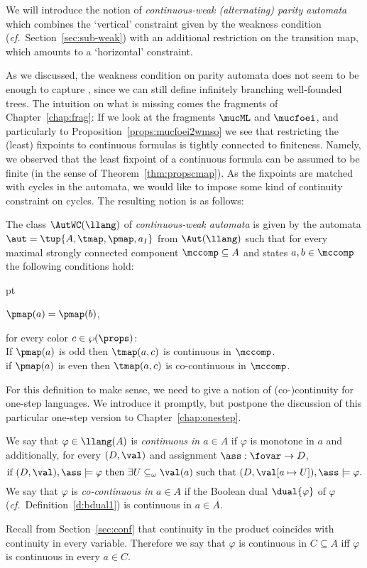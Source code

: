 
We will introduce the notion of \emph{continuous-weak (alternating) parity automata} which combines the `vertical' constraint given by the weakness condition (\emph{cf.}~Section~\ref{sec:sub-weak}) with an additional restriction on the transition map, which amounts to a `horizontal' constraint.

As we discussed, the weakness condition on parity automata does not seem to be enough to capture \wmso, since we can still define infinitely branching well-founded trees. The intuition on what is missing comes the fragments of Chapter~\ref{chap:frag}:
%
If we look at the fragments $\mucML$ and $\mucfoei$, and particularly to Proposition~\ref{props:mucfoei2wmso} we see that restricting the (least) fixpoints to continuous formulas is tightly connected to finiteness. Namely, we observed that the least fixpoint of a continuous formula can be assumed to be finite (in the sense of Theorem~\ref{thm:propscmap}).
%
As the fixpoints are matched with cycles in the automata, we would like to impose some kind of continuity constraint on cycles. The resulting notion is as follows:


\begin{definition}
The class $\AutWC(\llang)$ of \emph{continuous-weak automata} is given by the automata
$\aut = \tup{A,\tmap,\pmap,a_I}$ from $\Aut(\llang)$ such that for every maximal strongly connected component $\mccomp \subseteq A$ and states $a,b \in \mccomp$
the following conditions hold:
\begin{description}
	 pt
	\item[(weakness)] $\pmap(a)=\pmap(b)$,
	\item[(continuity)] for every color $c\in\wp(\props)$:\\
	If $\pmap(a)$ is odd then $\tmap(a,c)$ is continuous in $\mccomp$.\\
	if $\pmap(a)$ is even then $\tmap(a,c)$ is co-continuous in $\mccomp$.
\end{description}
\end{definition}

For this definition to make sense, we need to give a notion of (co-)continuity for one-step languages. We introduce it promptly, but postpone the discussion of this particular one-step version to Chapter~\ref{chap:onestep}.

\begin{definition}\label{def:os-continuity}
We say that $\varphi\in\llang(A)$ is \emph{continuous in $a\in A$} if $\varphi$ is monotone in $a$ and additionally, for every $(D,\val)$ and assignment $\ass:\fovar\to D$,
\[
\text{if } (D,\val),\ass \models \varphi \text{ then } \exists U \subseteq_\omega \val(a) \text{ such that } (D, \val[a \mapsto U]),\ass \models \varphi.
\]
%
We say that $\varphi$ is \emph{co-continuous in $a\in A$} if the Boolean dual $\dual{\varphi}$ of $\varphi$ (\emph{cf.}~Definition~\ref{d:bdual1}) is continuous in $a\in A$.
\end{definition}
%
Recall from Section~\ref{sec:conf} that continuity in the product coincides with continuity in every variable. Therefore we say that $\varphi$ is continuous in $C \subseteq A$ iff $\varphi$ is continuous in every $a\in C$.

